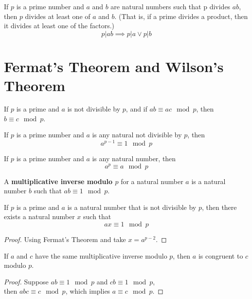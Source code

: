 \documentclass[11pt]{article}
\begin{document}
		\begin{corollary}[4.1.3]
			 If $p$ is a prime number and $a$ and $b$ are natural numbers such that p divides $ab$, then $p$ divides at least one of $a$ and $b$. (That is, if a prime divides a product, then it divides at least one of the factors.)
			 \[
			 	p | ab \implies p | a \lor p | b 
			 \]
		\end{corollary}
	
	\section{Fermat's Theorem and Wilson's Theorem}
		\begin{theorem}[5.1.1]
			If $p$ is a prime and $a$ is not divisible by $p$, and if $ab \equiv ac \mod p$, then $b \equiv c \mod p$.
		\end{theorem}
		
		\begin{theorem}
			If $p$ is a prime number and $a$ is any natural not divisible by $p$, then 
			\[
				a^{p-1} \equiv 1 \mod p
			\]
		\end{theorem}
		
		\begin{corollary}[5.1.3]
			If $p$ is a prime number and $a$ is any natural number, then 
			\[
				a^p \equiv a \mod p
			\]
		\end{corollary}
		
		\begin{definition}[5.1.4]
			A \textbf{multiplicative inverse modulo $p$} for a natural number $a$ is a natural number $b$ such that $ab \equiv 1 \mod p$.
		\end{definition}
		
		\begin{corollary}[5.1.5]
			If $p$ is a prime and $a$ is a natural number that is not divisible by $p$, then there exists a natural number $x$ such that
			\[
				ax \equiv 1 \mod p
			\]
		\end{corollary}
		\begin{proof}
			Using Fermat's Theorem and take $x = a^{p-2}$.
		\end{proof}
		
		\begin{lemma}[5.1.6]
			If $a$ and $c$ have the same multiplicative inverse modulo $p$, then $a$ is congruent to $c$ modulo $p$.
		\end{lemma}
		\begin{proof}
			Suppose $ab \equiv 1 \mod p$ and $cb \equiv 1 \mod p$, \\
			then $abc \equiv c \mod p$, which implies $a \equiv c \mod p$.
		\end{proof}
		
\end{document}
